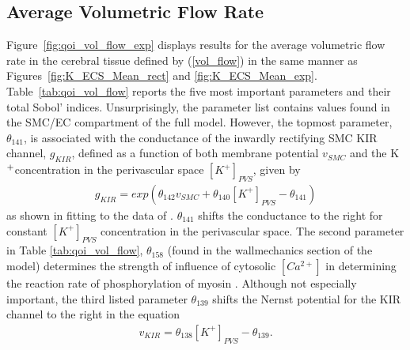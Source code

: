 \documentclass[smallextended]{svjour3}
\numberwithin{equation}{section}
\newcommand{\pot}{K$^{\text{\scriptsize +}}$}
\begin{document}
\subsection{Average Volumetric Flow Rate}
Figure~\ref{fig:qoi_vol_flow_exp} displays results for the average volumetric flow rate in the cerebral tissue defined by (\ref{vol_flow}) in the same manner as Figures~\ref{fig:K_ECS_Mean_rect} and \ref{fig:K_ECS_Mean_exp}.   Table~\ref{tab:qoi_vol_flow} reports the five most important parameters and their total Sobol' indices. Unsurprisingly, the parameter list contains values found in the SMC/EC compartment of the full model. However, the topmost parameter, $\theta_{141}$, is associated with the conductance of the inwardly rectifying SMC KIR channel, $g_{KIR}$, defined as a function of both membrane potential $v_{SMC}$ and the \pot concentration in the perivascular space $[K^+]_{PVS}$, given by 
\begin{eqnarray}
g_{KIR}=exp\left( \theta_{142} v_{SMC}+\theta_{140}[K^+]_{PVS}-\theta_{141}\right)  \label{eqn:gkir}
\end{eqnarray}
as shown in \cite{Dormanns2015} fitting to the data of \cite{Filosa2006}. $\theta_{141}$ shifts the conductance to the right for constant $[K^+]_{PVS}$  concentration in the perivascular space. The second parameter in Table \ref{tab:qoi_vol_flow}, $\theta_{158}$ (found in the wallmechanics section of the model) determines the strength of influence of cytosolic $[Ca^{2+}]$ in determining the reaction rate of phosphorylation of myosin \cite{Hai1988}. Although not especially important, the third listed parameter $\theta_{139}$ shifts the Nernst potential for the KIR channel to the right in the equation
\begin{eqnarray}
v_{KIR}=\theta_{138} [K^+]_{PVS}-\theta_{139}. \label{vkir}
\end{eqnarray}
\end{document}
